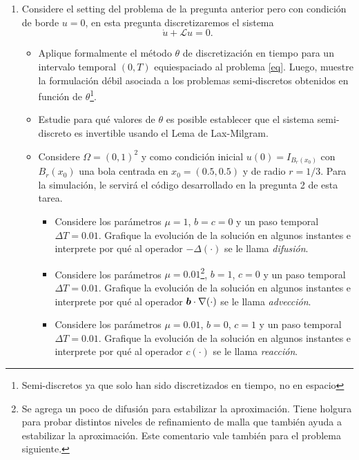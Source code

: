 \documentclass{article}
\renewcommand{\vec}{\vectorsym}
\begin{document}
\begin{enumerate}
    \item Considere el setting del problema de la pregunta anterior pero con condición de borde $u=0$, en esta pregunta discretizaremos el sistema
                \begin{equation}\label{eq}
                    \dot u + \mathcal L u = 0.
                \end{equation}
            \begin{itemize}
                \item{} Aplique formalmente el método $\theta$ de discretización en tiempo para un intervalo temporal $(0,T)$ equiespaciado al problema \eqref{eq}. Luego, muestre la formulación débil asociada a los problemas semi-discretos obtenidos en función de $\theta$\footnote{Semi-discretos ya que solo han sido discretizados en tiempo, no en espacio}.
                \item{} Estudie para qué valores de $\theta$ es posible establecer que el sistema semi-discreto es invertible usando el Lema de Lax-Milgram.
                \item Considere $\Omega = (0,1)^2$ y como condición inicial $u(0) = I_{B_r(x_0)}$ con $B_r(x_0)$  una bola centrada en $x_0=(0.5,0.5)$ y de radio $r=1/3$. Para la simulación, le servirá el código desarrollado en la pregunta 2 de esta tarea.
                    \begin{itemize}
                        \item{} Considere los parámetros $\mu=1$, $b=c=0$ y un paso temporal $\Delta T=0.01$. Grafique la evolución de la solución en algunos instantes e interprete por qué al operador $-\Delta (\cdot)$ se le llama \emph{difusión}. 
                        \item{} Considere los parámetros $\mu=0.01$\footnote{Se agrega un poco de difusión para estabilizar la aproximación. Tiene holgura para probar distintos niveles de refinamiento de malla que también ayuda a estabilizar la aproximación. Este comentario vale también para el problema siguiente.}, $b=1$, $c=0$ y un paso temporal $\Delta T=0.01$. Grafique la evolución de la solución en algunos instantes e interprete por qué al operador $\vec b \cdot\nabla(\cdot)$ se le llama \emph{advección}.
                        \item{} Considere los parámetros $\mu=0.01$, $b=0$, $c=1$ y un paso temporal $\Delta T=0.01$. Grafique la evolución de la solución en algunos instantes e interprete por qué al operador $c (\cdot)$ se le llama \emph{reacción}.
                    \end{itemize}
            \end{itemize}
\end{enumerate} %
\end{document}
